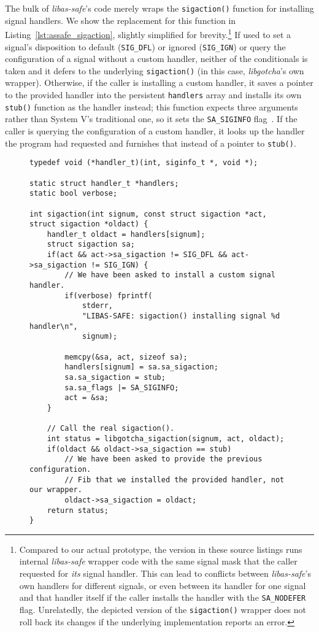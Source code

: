 The bulk of \textit{libas-safe}'s code merely wraps the \texttt{sigaction()} function
for installing signal handlers.  We show the replacement for this function in
Listing~\ref{lst:assafe_sigaction}, slightly simplified for
brevity.\footnote{Compared to our actual prototype, the version in these source
listings runs internal \textit{libas-safe} wrapper code with the same signal mask that
the caller requested for \textit{its} signal handler.  This can lead to conflicts
between \textit{libas-safe}'s own handlers for different signals, or even between its
handler for one signal and that handler itself if the caller installs the handler
with the \texttt{SA\_NODEFER} flag.  Unrelatedly, the depicted version of the
\texttt{sigaction()} wrapper does not roll back its changes if the underlying
implementation reports an error.}  If used to set a signal's disposition to default
(\texttt{SIG\_DFL}) or ignored (\texttt{SIG\_IGN}) or query the configuration of a
signal without a custom handler, neither of the conditionals is taken and it defers
to the underlying \texttt{sigaction()} (in this case, \textit{libgotcha}'s own
wrapper).  Otherwise, if the caller is installing a custom handler, it saves a
pointer to the provided handler into the persistent \texttt{handlers} array and
installs its own \texttt{stub()} function as the handler instead; this function
expects three arguments rather than System V's traditional one, so it sets the
\texttt{SA\_SIGINFO} flag~\cite{sigaction-manpage}.  If the caller is querying the
configuration of a custom handler, it looks up the handler the program had requested
and furnishes that instead of a pointer to \texttt{stub()}.

\begin{figure}
\begin{lstlisting}[label=lst:assafe_sigaction,caption=\textit{libas-safe}'s \texttt{sigaction()} replacement]
typedef void (*handler_t)(int, siginfo_t *, void *);

static struct handler_t *handlers;
static bool verbose;

int sigaction(int signum, const struct sigaction *act, struct sigaction *oldact) {
	handler_t oldact = handlers[signum];
	struct sigaction sa;
	if(act && act->sa_sigaction != SIG_DFL && act->sa_sigaction != SIG_IGN) {
		// We have been asked to install a custom signal handler.
		if(verbose) fprintf(
			stderr,
			"LIBAS-SAFE: sigaction() installing signal %d handler\n",
			signum);

		memcpy(&sa, act, sizeof sa);
		handlers[signum] = sa.sa_sigaction;
		sa.sa_sigaction = stub;
		sa.sa_flags |= SA_SIGINFO;
		act = &sa;
	}

	// Call the real sigaction().
	int status = libgotcha_sigaction(signum, act, oldact);
	if(oldact && oldact->sa_sigaction == stub)
		// We have been asked to provide the previous configuration.
		// Fib that we installed the provided handler, not our wrapper.
		oldact->sa_sigaction = oldact;
	return status;
}
\end{lstlisting}
\end{figure}

